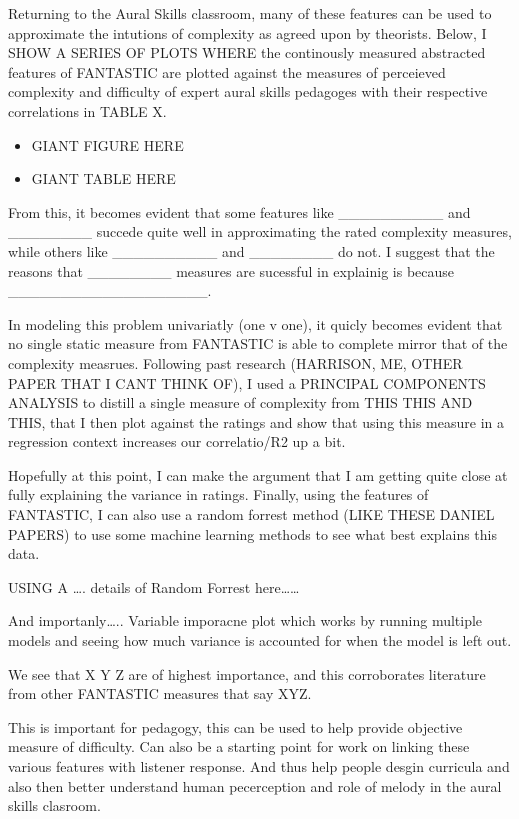 \documentclass[]{book}
\begin{document}
Returning to the Aural Skills classroom, many of these features can be used to approximate the intutions of complexity as agreed upon by theorists.
Below, I SHOW A SERIES OF PLOTS WHERE the continously measured abstracted features of FANTASTIC are plotted against the measures of perceieved complexity and difficulty of expert aural skills pedagoges with their respective correlations in TABLE X.

\begin{itemize}
\item
  GIANT FIGURE HERE
\item
  GIANT TABLE HERE
\end{itemize}

From this, it becomes evident that some features like \_\_\_\_\_\_\_\_\_\_ and \_\_\_\_\_\_\_\_ succede quite well in approximating the rated complexity measures, while others like \_\_\_\_\_\_\_\_\_\_ and \_\_\_\_\_\_\_\_ do not.
I suggest that the reasons that \_\_\_\_\_\_\_\_ measures are sucessful in explainig is because \_\_\_\_\_\_\_\_\_\_\_\_\_\_\_\_\_\_\_.

In modeling this problem univariatly (one v one), it quicly becomes evident that no single static measure from FANTASTIC is able to complete mirror that of the complexity measrues.
Following past research (HARRISON, ME, OTHER PAPER THAT I CANT THINK OF), I used a PRINCIPAL COMPONENTS ANALYSIS to distill a single measure of complexity from THIS THIS AND THIS, that I then plot against the ratings and show that using this measure in a regression context increases our correlatio/R2 up a bit.

Hopefully at this point, I can make the argument that I am getting quite close at fully explaining the variance in ratings.
Finally, using the features of FANTASTIC, I can also use a random forrest method (LIKE THESE DANIEL PAPERS) to use some machine learning methods to see what best explains this data.

USING A \ldots{}. details of Random Forrest here\ldots{}\ldots{}

And importanly\ldots{}.. Variable imporacne plot which works by running multiple models and seeing how much variance is accounted for when the model is left out.

We see that X Y Z are of highest importance, and this corroborates literature from other FANTASTIC measures that say XYZ.

This is important for pedagogy, this can be used to help provide objective measure of difficulty.
Can also be a starting point for work on linking these various features with listener response.
And thus help people desgin curricula and also then better understand human pecerception and role of melody in the aural skills clasroom.
\end{document}

